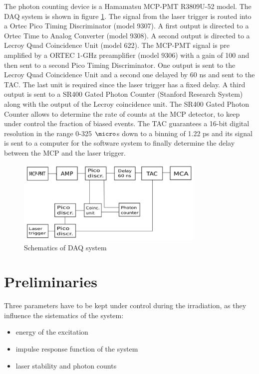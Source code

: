 The photon counting device is a Hamamatsu MCP-PMT R3809U-52 model. The DAQ system is shown in figure \ref{fig:daq}.
The signal from the laser trigger is routed into a Ortec Pico Timing Discriminator (model 9307). A first output is directed to a Ortec Time to Analog Converter (model 9308).
A second output is directed to a Lecroy Quad Coincidence Unit (model 622).
The MCP-PMT signal is pre amplified by a ORTEC 1-GHz preamplifier (model 9306) with a gain of 100 and then sent to a second Pico Timing Discriminator. One output is sent to the Lecroy Quad Coincidence Unit and a second one delayed by 60 ns and sent to the TAC. The last unit is required since the laser trigger has a fixed delay. 
A third output is sent to a SR400 Gated Photon Counter (Stanford Research System) along with the output of the Lecroy coincidence unit.
The SR400 Gated Photon Counter allows to determine the rate of counts at the MCP detector, to keep under control the fraction of biased events.
The TAC guarantees a 16-bit digital resolution in the range 0-325 $\micro$s down to a binning of 1.22 ps and its signal is sent to a computer for the software system to finally determine the delay between the MCP and the laser trigger.
\begin{figure}[htbp]
\begin{center}
\includegraphics[width=9cm]{../Pictures/Chapter_7/electronics.pdf}
\end{center}
\caption[VUV DAQ]{Schematics of DAQ system}
\label{fig:daq}
\end{figure}

\section{Preliminaries}
Three parameters have to be kept under control during the irradiation, as they influence the sistematics of the system:
\begin{itemize}
\item energy of the excitation
\item impulse response function of the system
\item laser stability and photon counts
\end{itemize}

